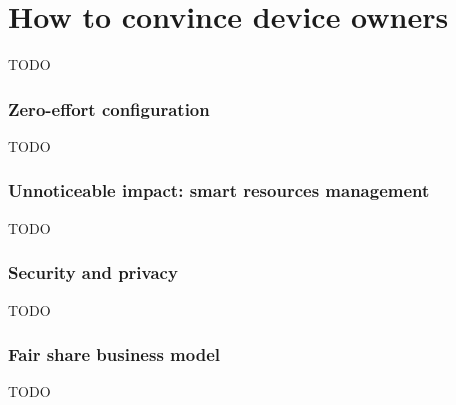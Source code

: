 \section{How to convince device owners}
TODO

\subsubsection{Zero-effort configuration}
TODO

\subsubsection{Unnoticeable impact: smart resources management}
TODO

\subsubsection{Security and privacy}
TODO

\subsubsection{Fair share business model}
TODO

